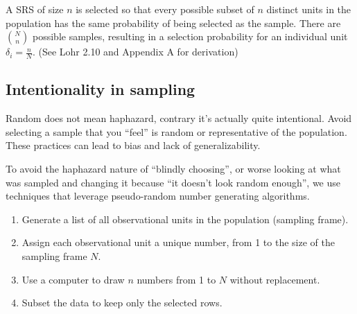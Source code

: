 \documentclass[
  letterpaper,
  DIV=11,
  numbers=noendperiod]{scrartcl}
\providecommand{\tightlist}{%
  \setlength{\itemsep}{0pt}\setlength{\parskip}{0pt}}\usepackage{longtable,booktabs,array}
\begin{document}
\begin{tcolorbox}[enhanced jigsaw, toptitle=1mm, breakable, colframe=quarto-callout-important-color-frame, colbacktitle=quarto-callout-important-color!10!white, left=2mm, titlerule=0mm, bottomtitle=1mm, title=\textcolor{quarto-callout-important-color}{\faExclamation}\hspace{0.5em}{Definition: Simple random sample (SRS) without replacement:}, bottomrule=.15mm, rightrule=.15mm, arc=.35mm, toprule=.15mm, colback=white, opacityback=0, leftrule=.75mm, coltitle=black, opacitybacktitle=0.6]

A SRS of size \(n\) is selected so that every possible subset of \(n\)
distinct units in the population has the same probability of being
selected as the sample. There are \(\binom{N}{n}\) possible samples,
resulting in a selection probability for an individual unit
\(\delta_{i} = \frac{n}{N}\). (See Lohr 2.10 and Appendix A for
derivation)

\end{tcolorbox}

\hypertarget{intentionality-in-sampling}{%
\subsection{Intentionality in
sampling}\label{intentionality-in-sampling}}

Random does not mean haphazard, contrary it's actually quite
intentional. Avoid selecting a sample that you ``feel'' is random or
representative of the population. These practices can lead to bias and
lack of generalizability.

To avoid the haphazard nature of ``blindly choosing'', or worse looking
at what was sampled and changing it because ``it doesn't look random
enough'', we use techniques that leverage pseudo-random number
generating algorithms.

\begin{tcolorbox}[enhanced jigsaw, toptitle=1mm, breakable, colframe=quarto-callout-important-color-frame, colbacktitle=quarto-callout-important-color!10!white, left=2mm, titlerule=0mm, bottomtitle=1mm, title=\textcolor{quarto-callout-important-color}{\faExclamation}\hspace{0.5em}{Process}, bottomrule=.15mm, rightrule=.15mm, arc=.35mm, toprule=.15mm, colback=white, opacityback=0, leftrule=.75mm, coltitle=black, opacitybacktitle=0.6]

\begin{enumerate}
\def\labelenumi{\arabic{enumi}.}
\tightlist
\item
  Generate a list of all observational units in the population (sampling
  frame).
\item
  Assign each observational unit a unique number, from 1 to the size of
  the sampling frame \(N\).
\item
  Use a computer to draw \(n\) numbers from 1 to \(N\) without
  replacement.
\item
  Subset the data to keep only the selected rows.
\end{enumerate}

\end{tcolorbox}
\end{document}
